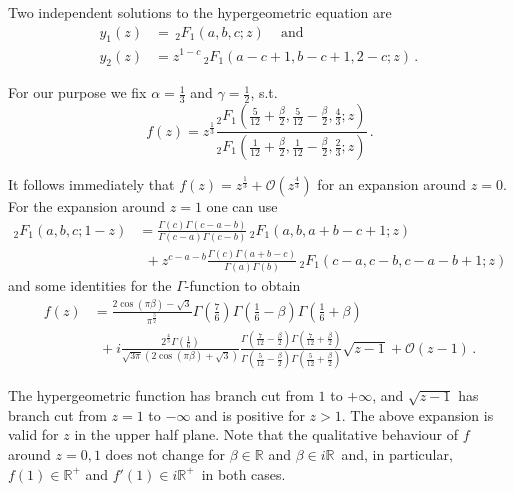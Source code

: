 \documentclass[11pt,a4paper]{article}
\numberwithin{equation}{section}
\begin{document}
\noindent
Two independent solutions to the hypergeometric equation are \cite[9.153]{zwillinger2014table}
%
\begin{equation}
    \begin{split}
        y_1(z) &= \,_2F_1(a,b,c;z)\,\quad\text{and}\\
        y_2(z) &= z^{1-c} \,_2F_1(a-c+1,b-c+1,2-c;z)\,.      
        \,
    \end{split}
\end{equation}

\noindent 
For our purpose we fix $\alpha = \frac{1}{3}$ and $\gamma=\frac{1}{2}$, s.t. 
%
\begin{equation}\label{eq:f-map}
    f(z) = z^{\frac{1}{3}} \frac{_2F_1\left(\frac{5}{12}+\frac\beta2,\frac{5}{12}-\frac\beta2,\frac{4}{3};z\right)}{_2F_1\left(\frac{1}{12}+\frac\beta2,\frac{1}{12}-\frac\beta2,\frac{2}{3};z\right)}\,.
\end{equation}

\noindent 
It follows immediately that $f(z) = z^{\frac{1}{3}} + \mathcal{O}(z^{\frac{4}{3}})$ for an expansion around $z=0$. For the expansion around $z=1$ one can use \cite[Eq.\,9.131\,(2)]{zwillinger2014table}
%
\begin{equation}
\begin{split}
    _2F_1(a,b,c;1-z) &= \frac{\Gamma(c)\Gamma(c-a-b)}{\Gamma(c-a)\Gamma(c-b)}\,_2F_1(a,b,a+b-c+1;z) \\
    &~~+ z^{c-a-b} \frac{\Gamma(c)\Gamma(a+b-c)}{\Gamma(a)\Gamma(b)}\,_2F_1(c-a,c-b,c-a-b+1;z)
\end{split}
\end{equation}
%
and some identities for the $\Gamma$-function to obtain
%
\begin{equation}
\begin{split}
    f(z) &= \frac{2\cos(\pi\beta)-\sqrt{3}}{\pi^{\frac{3}{2}}} \Gamma\!\left(\tfrac{7}{6}\right) \Gamma\!\left(\tfrac{1}{6}-\beta\right)\Gamma\!\left(\tfrac{1}{6}+\beta\right) \\
    &~~+ i \frac{ 2^\frac{4}{3}\Gamma\!\left(\frac{1}{6}\right)}{\sqrt{3\pi}\left(2\cos(\pi\beta)+\sqrt{3}\right)} \frac{\Gamma\!\left(\frac{7}{12}-\frac{\beta}{2}\right)\Gamma\!\left(\frac{7}{12}+\frac{\beta}{2}\right)}{\Gamma\!\left(\frac{5}{12}-\frac{\beta}{2}\right)\Gamma\!\left(\frac{5}{12}+\frac{\beta}{2}\right)}  \sqrt{z-1}  +\mathcal{O}\left(z-1\right)\,.
\end{split}
\end{equation}

\noindent
The hypergeometric function has branch cut from $1$ to $+\infty$, and $\sqrt{z-1}$ has branch cut from $z=1$ to $-\infty$ and is positive for $z>1$. The above expansion is valid for $z$ in the upper half plane. 
%
Note that the qualitative behaviour of $f$ around $z=0,1$ does not change for $\beta \in \mathbb{R}$ and $\beta\in i \mathbb{R}$\, and, in particular, $f(1)\in \mathbb{R}^+$ and $f'(1) \in i \mathbb{R}^+$\, in both cases.
\end{document}
